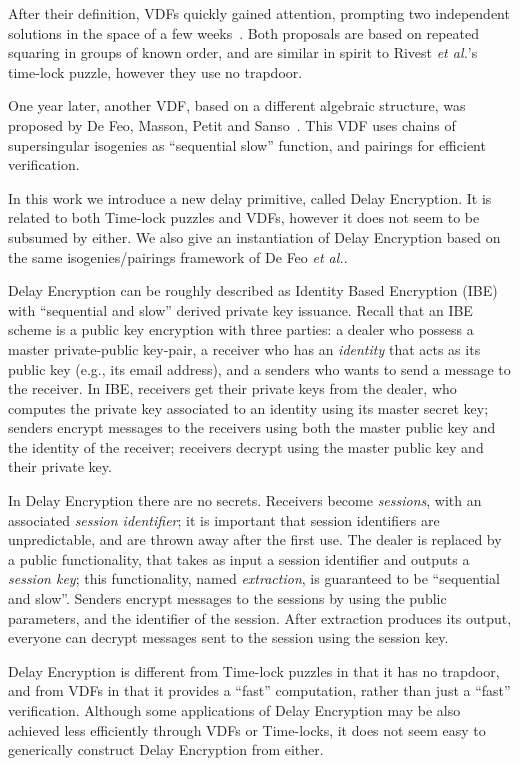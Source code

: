 \documentclass{llncs}
\begin{document}
After their definition, VDFs quickly gained attention, prompting two
independent solutions in the space of a few
weeks~\cite{Wesolowski,Pietrzak}. %
Both proposals are based on repeated squaring in groups of known
order, and are similar in spirit to Rivest \emph{et al.}'s time-lock
puzzle, however they use no trapdoor.

One year later, another VDF, based on a different algebraic structure,
was proposed by De Feo, Masson, Petit and
Sanso~\cite{10.1007/978-3-030-34578-5_10}. %
This VDF uses chains of supersingular isogenies as ``sequential slow''
function, and pairings for efficient verification.

In this work we introduce a new delay primitive, called Delay
Encryption. %
It is related to both Time-lock puzzles and VDFs, however it does not
seem to be subsumed by either. %
We also give an instantiation of Delay Encryption based on the same
isogenies/pairings framework of De Feo \emph{et al.}.

Delay Encryption can be roughly described as Identity Based Encryption
(IBE) with ``sequential and slow'' derived private key issuance. %
Recall that an IBE scheme is a public key encryption with three
parties: a dealer who possess a master private-public key-pair, a
receiver who has an \emph{identity} that acts as its public key (e.g.,
its email address), and a senders who wants to send a message to the
receiver. %
In IBE, receivers get their private keys from the dealer, who computes
the private key associated to an identity using its master secret key;
senders encrypt messages to the receivers using both the master public
key and the identity of the receiver; receivers decrypt using the
master public key and their private key.

In Delay Encryption there are no secrets. %
Receivers become \emph{sessions}, with an associated \emph{session
  identifier}; it is important that session identifiers are
unpredictable, and are thrown away after the first use. %
The dealer is replaced by a public functionality, that takes as input
a session identifier and outputs a \emph{session key}; this
functionality, named \emph{extraction}, is guaranteed to be
``sequential and slow''. %
Senders encrypt messages to the sessions by using the public
parameters, and the identifier of the session. %
After extraction produces its output, everyone can decrypt messages
sent to the session using the session key.

Delay Encryption is different from Time-lock puzzles in that it has no
trapdoor, and from VDFs in that it provides a ``fast'' computation,
rather than just a ``fast'' verification. %
Although some applications of Delay Encryption may be also achieved
less efficiently through VDFs or Time-locks, it does not seem easy to
generically construct Delay Encryption from either.
\end{document}
